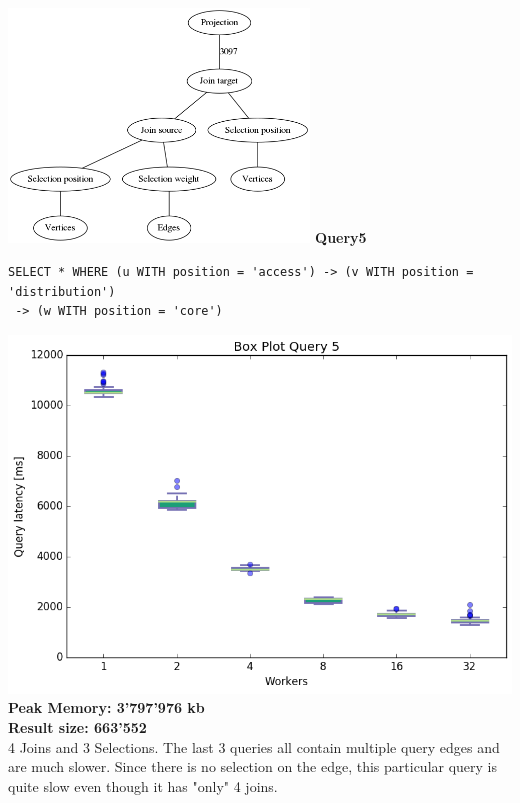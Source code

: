 \documentclass[11pt,singlecolumn]{scrartcl}
\begin{document}
\includegraphics[width=0.6\textwidth]{graph4}\clearpage
\textbf{Query5}\\
\begin{verbatim}
SELECT * WHERE (u WITH position = 'access') -> (v WITH position = 'distribution')
 -> (w WITH position = 'core')\end{verbatim}
\includegraphics[width=1\textwidth]{box/q5}
\textbf{Peak Memory: 3'797'976 kb}\\
\textbf{Result size: 663'552}\\
4 Joins and 3 Selections. The last 3 queries all contain multiple query edges and are much slower. Since there is no selection on the edge, this particular query is quite slow even though it has "only" 4 joins.
\clearpage
\end{document}
